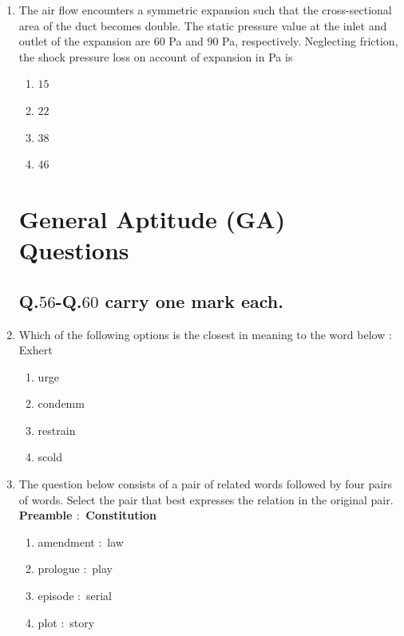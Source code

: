 \documentclass[journal,12pt,onecolumn]{IEEEtran}
\theoremstyle{remark}
\begin{document}
\begin{enumerate}
\item  The air flow encounters a symmetric expansion such that the cross-sectional area of the duct becomes double. The static pressure value at the inlet and outlet of the expansion are $60$ Pa and $90$ Pa, respectively. Neglecting friction, the shock pressure loss on account of expansion in Pa is

\hfill{}
\begin{multicols}{4}
\begin{enumerate}
\item $15$
\item $22$
\item $38$
\item $46$
\end{enumerate}
\end{multicols}

\section*{General Aptitude (GA) Questions}
\subsection*{Q.$56$-Q.$60$ carry one mark each.}
\item Which of the following options is the closest in meaning to the word below $\colon$
Exhert


\hfill{}

\begin{enumerate}
\item urge
\item condemm
\item restrain
\item scold
\end{enumerate}

\item The question below consists of a pair of related words followed by four pairs of words. Select the
pair that best expresses the relation in the original pair.
\textbf{Preamble $\colon$ Constitution}


\hfill{}

\begin{enumerate}
\item amendment $\colon$ law
\item prologue $\colon$ play
\item episode $\colon$ serial
\item plot $\colon$ story
\end{enumerate}


\end{enumerate}
\end{document}
